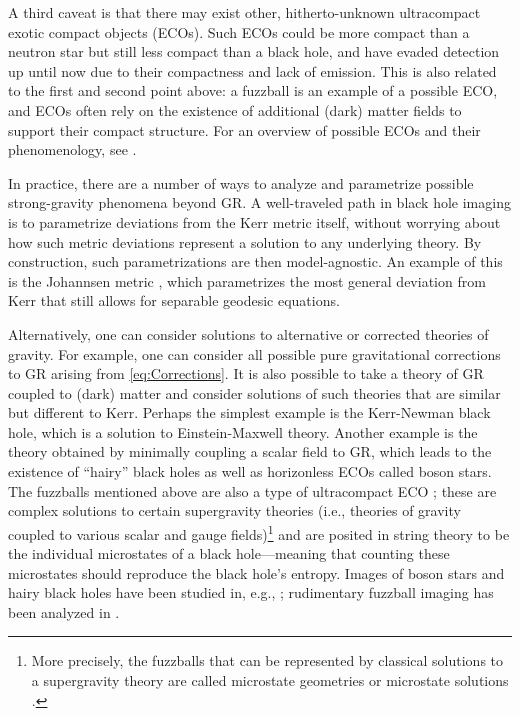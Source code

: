 \documentclass[graybox,envcountchap]{svmult}
\begin{document}
A third caveat is that there may exist other, hitherto-unknown ultracompact exotic compact objects (ECOs).
Such ECOs could be more compact than a neutron star but still less compact than a black hole, and have evaded detection up until now due to their compactness and lack of emission.
This is also related to the first and second point above: a fuzzball is an example of a possible ECO, and ECOs often rely on the existence of additional (dark) matter fields to support their compact structure.
For an overview of possible ECOs and their phenomenology, see \cite{Cardoso2019}.

\bigskip

In practice, there are a number of ways to analyze and parametrize possible strong-gravity phenomena beyond GR.
A well-traveled path in black hole imaging is to parametrize deviations from the Kerr metric itself, without worrying about how such metric deviations represent a solution to any underlying theory.
By construction, such parametrizations are then model-agnostic.
An example of this is the Johannsen metric \cite{Johannsen2013,Johannsen2011}, which parametrizes the most general deviation from Kerr that still allows for separable geodesic equations.

Alternatively, one can consider solutions to alternative or corrected theories of gravity.
For example, one can consider all possible pure gravitational corrections to GR arising from \eqref{eq:Corrections}.
It is also possible to take a theory of GR coupled to (dark) matter and consider solutions of such theories that are similar but different to Kerr.
Perhaps the simplest example is the Kerr-Newman black hole, which is a solution to Einstein-Maxwell theory.
Another example is the theory obtained by minimally coupling a scalar field to GR, which leads to the existence of ``hairy'' black holes \cite{Herdeiro2014,Herdeiro2015} as well as horizonless ECOs called boson stars.
The fuzzballs mentioned above are also a type of ultracompact ECO \cite{Mathur2005,Mayerson2020}; these are complex solutions to certain supergravity theories (i.e., theories of gravity coupled to various scalar and gauge fields)\footnote{More precisely, the fuzzballs that can be represented by classical solutions to a supergravity theory are called microstate geometries or microstate solutions \cite{Bena2023}.} and are posited in string theory to be the individual microstates of a black hole---meaning that counting these microstates should reproduce the black hole's entropy.
Images of boson stars and hairy black holes have been studied in, e.g., \cite{Cunha2015,Cunha2016,Vincent2016,Olivares2020}; rudimentary fuzzball imaging has been analyzed in \cite{Bacchini2021}.
\end{document}
